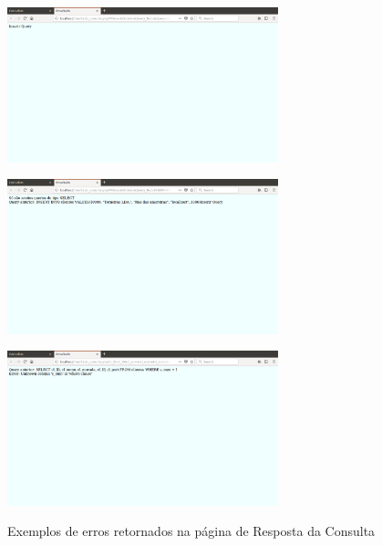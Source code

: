 \documentclass[11pt,twoside,a4paper]{report}
\begin{document}
\newpage
\begin{figure}[H]
	\centering
	\begin{minipage}{1\textwidth}
		\begin{center}
			\includegraphics[width=0.7\textwidth]{consultas03} %
			\label{fig:consultas4}
		\end{center}
	\end{minipage}
	\begin{minipage}{1\textwidth}
		\begin{center}
			\includegraphics[width=0.7\textwidth]{consultas04} %
			\label{fig:consultas5}
		\end{center}
	\end{minipage}
	\begin{minipage}{1\textwidth}
		\begin{center}
			\includegraphics[width=0.7\textwidth]{consultas05} %
			\label{fig:consultas6}
		\end{center}
	\end{minipage}
	\caption{Exemplos de erros retornados na página de Resposta da Consulta}
	\label{fig:consultas3}
\end{figure}
\end{document}
